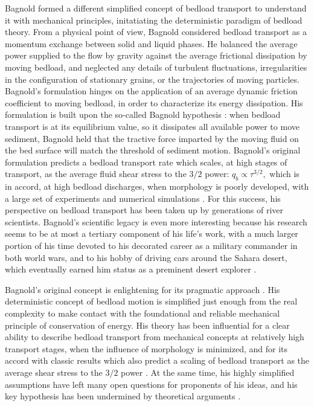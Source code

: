 \documentclass{article}
\begin{document}
Bagnold formed a different simplified concept of bedload transport to understand it with mechanical principles, initatiating the deterministic paradigm of bedload theory. 
From a physical point of view, Bagnold considered bedload transport as a momentum exchange between solid and liquid phases.
He balanced the average power supplied to the flow by gravity against the average frictional dissipation by moving bedload, and neglected any details of turbulent fluctuations, irregularities in the configuration of stationary grains, or the trajectories of moving particles.
Bagnold's formulation hinges on the application of an average dynamic friction coefficient to moving bedload, in order to characterize its energy dissipation. 
His formulation is built upon the so-called Bagnold hypothesis \citep{Bagnold1973, Engelund1976, Luque1976, Seminara2002, Ancey2006}: when bedload transport is at its equilibrium value, so it dissipates all available power to move sediment, Bagnold held that the tractive force imparted by the moving fluid on the bed surface will match the threshold of sediment motion.
Bagnold's original formulation predicts a bedload transport rate which scales, at high stages of transport, as the average fluid shear stress to the $3/2$ power: $q_b \propto \tau^{3/2},$ which is in accord, at high bedload discharges, when morphology is poorly developed, with a large set of experiments and numerical simulations \citep{MeyerPeter1948,Gomez1989,Schmeeckle2014, Elghannay2017}.
For this success, his perspective on bedload transport has been taken up by generations of river scientists.
Bagnold's scientific legacy is even more interesting because his research seems to be at most a tertiary component of his life's work, with a much larger portion of his time devoted to his decorated career as a military commander in both world wars, and to his hobby of driving cars around the Sahara desert, which eventually earned him status as a preminent desert explorer \citep{Bagnold1988}. 

Bagnold's original concept is enlightening for its pragmatic approach \citep{Ashida1972, Bagnold1973, Engelund1976, Luque1976}. 
His deterministic concept of bedload motion is simplified just enough from the real complexity to make contact with the foundational and reliable mechanical principle of conservation of energy. 
His theory has been influential for a clear ability to describe bedload transport from mechanical concepts at relatively high transport stages, when the influence of morphology is minimized, and for its accord with classic results which also predict a scaling of bedload transport as the average shear stress to the $3/2$ power \citep{MeyerPeter1948}.
At the same time, his highly simplified assumptions have left many open questions for proponents of his ideas, and his key hypothesis has been undermined by theoretical arguments \citep{Seminara2002}. 
\end{document}
